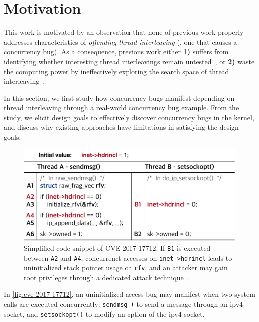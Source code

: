 \section{Motivation}
\label{s:motivation}


This work is motivated by an observation that none of previous work
properly addresses characteristics of \textit{offending thread
  interleaving} (\ie, one that causes a concurrency bug).
%
As a consequence, previous work either \textbf{1)} suffers from
identifying whether interesting thread interleavings remain
untested~\cite{krace, conzzer, muzz}, or \textbf{2)} waste the
computing power by ineffectively exploring the search space of thread
interleaving~\cite{snowboard, razzer}.



In this section, we first study how concurrency bugs manifest
depending on thread interleaving through a real-world concurrency bug
example.
%
From the study, we elicit design goals to effectively discover concurrency
bugs in the kernel, and discuss why existing approaches have limitations 
in satisfying the design goals.


%
\begin{figure}[t]
  \centering
  \includegraphics[width=0.9\linewidth]{fig/cve-2017-10661.pdf}
  \caption{Simplified code snippet of CVE-2017-17712. If \texttt{B1}
    is executed between \texttt{A2} and \texttt{A4}, concurrenct
    accesses on \texttt{inet->hdrincl} leads to uninitialized stack
    pointer usage on \texttt{rfv}, and an attacker may gain root
    privileges through a dedicated attack
    technique~\cite{stackspray}.}
  \label{fig:cve-2017-17712}
\end{figure}
%
In \autoref{fig:cve-2017-17712}, an uninitialized access bug may
manifest when two system calls are executed concurrently:
\texttt{sendmsg()} to send a message through an ipv4 socket, and
\texttt{setsockopt()} to modify an option of the ipv4 socket.

